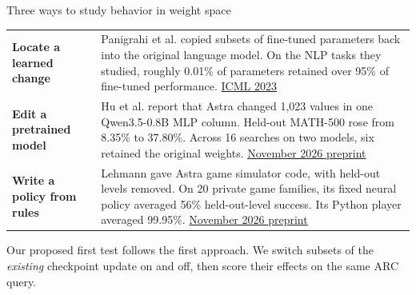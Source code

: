 \begin{frame}[t]{Three ways to study behavior in weight space}
\med
\begin{tabular}{@{}>{\raggedright\arraybackslash\bfseries}p{43mm}>{\raggedright\arraybackslash}p{165mm}@{}}
Locate a learned change & Panigrahi et al. copied subsets of fine-tuned parameters back into the original language model. On the NLP tasks they studied, roughly 0.01\% of parameters retained over 95\% of fine-tuned performance. \href{https://proceedings.mlr.press/v202/panigrahi23a.html}{\textcolor{accent}{ICML 2023}}\\[3mm]
Edit a pretrained model & Hu et al. report that Astra changed 1,023 values in one Qwen3.5-0.8B MLP column. Held-out MATH-500 rose from 8.35\% to 37.80\%. Across 16 searches on two models, six retained the original weights. \href{https://arxiv.org/html/2611.09382v1}{\textcolor{accent}{November 2026 preprint}}\\[3mm]
Write a policy from rules & Lehmann gave Astra game simulator code, with held-out levels removed. On 20 private game families, its fixed neural policy averaged 56\% held-out-level success. Its Python player averaged 99.95\%. \href{https://arxiv.org/html/2611.16981v1}{\textcolor{accent}{November 2026 preprint}}\\
\end{tabular}
\vfill
\smallbody Our proposed first test follows the first approach. We switch subsets of the \emph{existing} checkpoint update on and off, then score their effects on the same ARC query.
\end{frame}
